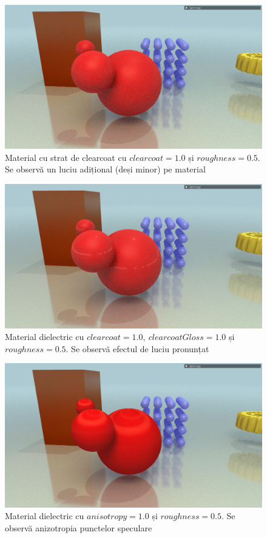 \documentclass[12pt,a4paper]{report}
\numberwithin{equation}{section} %
\begin{document}
\begin{figure}[!htb]
	\centering
	\includegraphics[width=\textwidth]{pics/demo-clearcoat-1.0.png}
	\caption{Material cu strat de clearcoat cu $clearcoat = 1.0$ și $roughness = 0.5$. Se observă un luciu
		adițional (deși minor) pe material}
	\label{fig:demo-clearcoat-1.0}
\end{figure}
\begin{figure}[!htb]
	\centering
	\includegraphics[width=\textwidth]{pics/demo-clearcoatGloss-1.0.png}
	\caption{Material dielectric cu $clearcoat = 1.0,\ clearcoatGloss = 1.0$ și $roughness = 0.5$. Se observă efectul de luciu pronunțat}
	\label{fig:demo-clearcoatGloss-1.0}
\end{figure}
\begin{figure}[!htb]
	\centering
	\includegraphics[width=\textwidth]{pics/demo-anisotropy-1.0.png}
	\caption{Material dielectric cu $anisotropy = 1.0$ și $roughness = 0.5$. Se observă anizotropia punctelor speculare}
	\label{fig:demo-anisotropy-1.0}
\end{figure}
\end{document}
